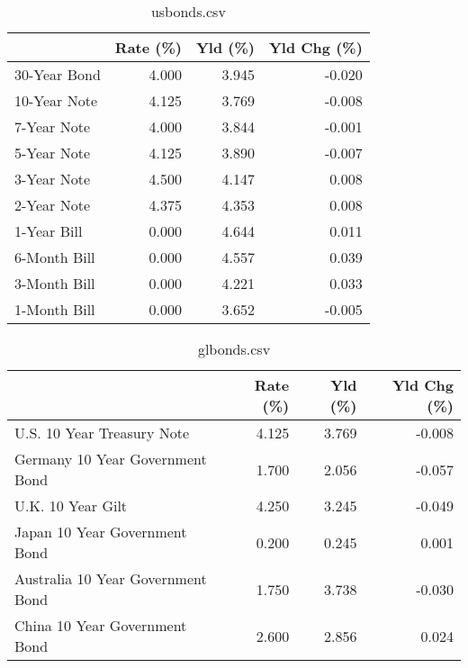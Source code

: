 \documentclass{article}%
\begin{document}
%


\begin{table}[htbp]%
\caption{usbonds.csv}%
\centering%
\begin{adjustbox}{width=1\textwidth}%
\begin{tabular}{lrrr}
\toprule
             &  Rate (\%) &  Yld (\%) &  Yld Chg (\%) \\
\midrule
30-Year Bond &     4.000 &    3.945 &       -0.020 \\
10-Year Note &     4.125 &    3.769 &       -0.008 \\
 7-Year Note &     4.000 &    3.844 &       -0.001 \\
 5-Year Note &     4.125 &    3.890 &       -0.007 \\
 3-Year Note &     4.500 &    4.147 &        0.008 \\
 2-Year Note &     4.375 &    4.353 &        0.008 \\
 1-Year Bill &     0.000 &    4.644 &        0.011 \\
6-Month Bill &     0.000 &    4.557 &        0.039 \\
3-Month Bill &     0.000 &    4.221 &        0.033 \\
1-Month Bill &     0.000 &    3.652 &       -0.005 \\
\bottomrule
\end{tabular}
%
\end{adjustbox}%
\end{table}

%


\begin{table}[htbp]%
\caption{glbonds.csv}%
\centering%
\begin{adjustbox}{width=1\textwidth}%
\begin{tabular}{lrrr}
\toprule
                                  &  Rate (\%) &  Yld (\%) &  Yld Chg (\%) \\
\midrule
       U.S. 10 Year Treasury Note &     4.125 &    3.769 &       -0.008 \\
  Germany 10 Year Government Bond &     1.700 &    2.056 &       -0.057 \\
                U.K. 10 Year Gilt &     4.250 &    3.245 &       -0.049 \\
    Japan 10 Year Government Bond &     0.200 &    0.245 &        0.001 \\
Australia 10 Year Government Bond &     1.750 &    3.738 &       -0.030 \\
    China 10 Year Government Bond &     2.600 &    2.856 &        0.024 \\
\bottomrule
\end{tabular}
%
\end{adjustbox}%
\end{table}
\end{document}
